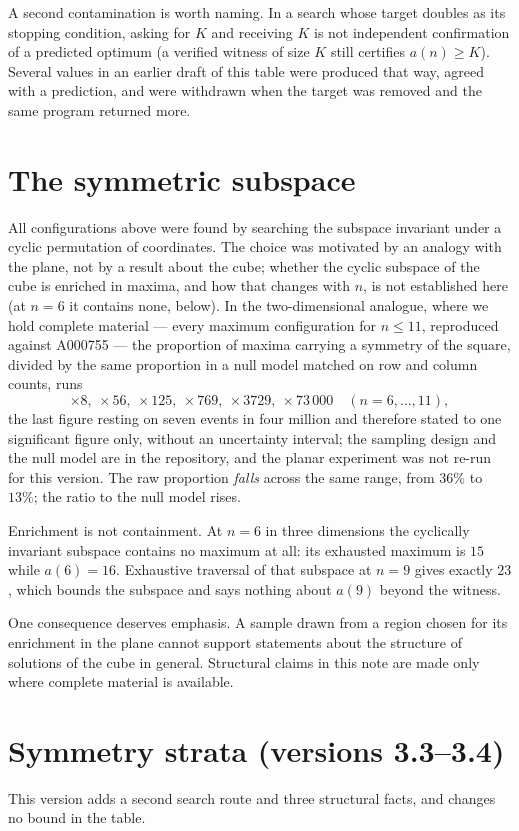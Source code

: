\documentclass[11pt,a4paper]{article}
\begin{document}
A second contamination is worth naming.  In a search whose target doubles as its stopping
condition, asking for $K$ and receiving $K$ is not independent confirmation of a predicted optimum
(a verified witness of size $K$ still certifies $a(n)\ge K$).  Several values in an
earlier draft of this table were produced that way, agreed with a prediction, and were withdrawn
when the target was removed and the same program returned more.

\section{The symmetric subspace}\label{s:subspace}
All configurations above were found by searching the subspace invariant under a cyclic
permutation of coordinates.  The choice was motivated by an analogy with the plane, not by a
result about the cube; whether the cyclic subspace of the cube is enriched in maxima, and how that
changes with $n$, is not established here (at $n=6$ it contains none, below).  In the two-dimensional
analogue, where we hold complete material --- every maximum
configuration for $n\le11$, reproduced against A000755 --- the proportion of maxima carrying a
symmetry of the square, divided by the same proportion in a null model matched on row and column
counts, runs
\[\times8,\ \times56,\ \times125,\ \times769,\ \times3729,\ \times73\,000\quad (n=6,\dots,11),\]
the last figure resting on seven events in four million and therefore stated to one significant
figure only, without an uncertainty interval; the sampling design and the null model are in the
repository, and the planar experiment was not re-run for this version.  The raw proportion \emph{falls} across the same range, from $36\%$ to $13\%$; the
ratio to the null model rises.

Enrichment is not containment.  At $n=6$ in three dimensions the cyclically invariant subspace
contains no maximum at all: its exhausted maximum is $15$ while $a(6)=16$.  Exhaustive traversal
of that subspace at $n=9$ gives exactly $23$, which bounds the subspace and says nothing about
$a(9)$ beyond the witness.

One consequence deserves emphasis.  A sample drawn from a region chosen for its enrichment in the
plane cannot support statements about the structure of solutions of the cube in general.  Structural
claims in this note are made only where complete material is available.

\section{Symmetry strata (versions 3.3--3.4)}\label{s:strata}
This version adds a second search route and three structural facts, and changes no bound in the
table.
\end{document}
